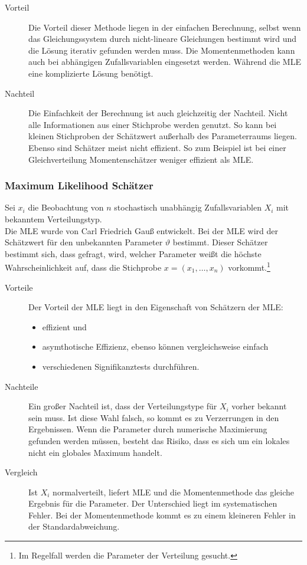 \begin{description}
	\item[Vorteil] Die Vorteil dieser Methode liegen in der einfachen Berechnung, selbst wenn das Gleichungssystem durch nicht-lineare Gleichungen bestimmt wird und die Lösung iterativ gefunden werden muss. Die Momentenmethoden kann auch bei abhängigen Zufallsvariablen eingesetzt werden. Während die \gls{MLE} eine komplizierte Lösung benötigt. 
	\item[Nachteil] Die Einfachkeit der Berechnung ist auch gleichzeitig der Nachteil. Nicht alle Informationen aus einer Stichprobe werden genutzt. So kann bei kleinen Stichproben der Schätzwert außerhalb des Parameterraums liegen. Ebenso sind Schätzer meist nicht effizient. So zum Beispiel ist bei einer Gleichverteilung Momentenschätzer weniger effizient als \gls{MLE}.
\end{description}


\subsubsection{Maximum Likelihood Schätzer}

Sei $x_i$ die Beobachtung von $n$ stochastisch unabhängig Zufallsvariablen $X_i$ mit bekanntem Verteilungstyp.\\

Die \gls{MLE} wurde von Carl Friedrich Gauß entwickelt. Bei der \gls{MLE} wird der Schätzwert für den unbekannten Parameter $\vartheta$ bestimmt. Dieser Schätzer bestimmt sich, dass gefragt, wird, welcher Parameter weißt die höchste Wahrscheinlichkeit auf, dass die Stichprobe $x=(x_1,\dots, x_n)$ vorkommt.\footnote{Im Regelfall werden die Parameter der Verteilung gesucht.}

\begin{description}
	\item[Vorteile] Der Vorteil der \gls{MLE} liegt in den Eigenschaft von Schätzern der \gls{MLE}: 
\begin{itemize}
	\item effizient und
	\item asymthotische Effizienz, ebenso können vergleichsweise einfach
	\item verschiedenen Signifikanztests durchführen.
\end{itemize}
	\item[Nachteile] Ein großer Nachteil ist, dass der Verteilungstype für $X_i$ vorher bekannt sein muss. Ist diese Wahl falsch, so kommt es zu Verzerrungen in den Ergebnissen. Wenn die Parameter durch numerische Maximierung gefunden werden müssen, besteht das Risiko, dass es sich um ein lokales nicht ein globales Maximum handelt.
	\item[Vergleich] Ist $X_i$ normalverteilt, liefert \gls{MLE} und die Momentenmethode das gleiche Ergebnis für die Parameter. Der Unterschied liegt im systematischen Fehler.	Bei der Momentenmethode kommt es zu einem kleineren Fehler in der Standardabweichung.
\end{description}


